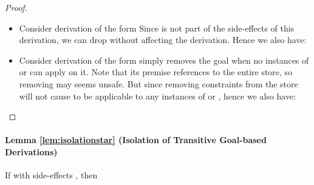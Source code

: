\documentclass{tlp}
\begin{document}
\begin{proof}
\begin{itemize}
	        \eda
	  \item {} Consider derivation of the form
	        \eda
	        Since  is not part of the side-effects of this derivation, we can drop  
	        without affecting the derivation. Hence we also have:
	        \eda
	  \item {} Consider derivation of the form
	          \goaltranssf{\{\} \backslash \{\}} 
	        \eda
	         simply removes the goal  when no instances of  or
	         can apply on it. Note that its premise references to the entire store, 
	        so removing  may seems unsafe. But since removing constraints from the store will not 
	        cause  to be applicable to any instances of  or ,
	        hence we also have:
	          \goaltranssf{\{\} \backslash \{\}} 
	        \eda
  \end{itemize}
\end{proof}

\paragraph{Lemma \ref{lem:isolationstar} (Isolation of Transitive Goal-based Derivations)}
If 
with side-effects , 
then 
\end{document}
